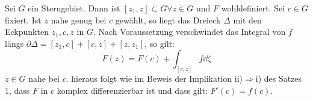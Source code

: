 \begin{beweis}
	Sei $ G $ ein Sterngebiet. Dann ist $ [z_1,z]\subset G\forall z\in G $ und $ F $ wohldefiniert. Sei $ c\in G $ fixiert. Ist $ z $ nahe genug bei $ c $ gew\"ahlt, so liegt das Dreieck $ \Delta $ mit den Eckpunkten $ z_1,c,z $ in $ G $. Nach Voraussetzung verschwindet das Integral von $ f $ l\"angs $ \partial\Delta=[z_1,c]+[c,z]+[z,z_1] $, so gilt:
	\[ F(z)=F(c)+\int_{[c,z]}^{} f\dd\zeta \]
	$ z\in G $ nahe bei $ c $. hieraus folgt wie im Beweis der Implikation ii)$ \Rightarrow $i) des Satzes 1, dass $ F $ in $ c $ komplex differenzierbar ist und dass gilt: $ F'(c)=f(c) $.
\end{beweis}